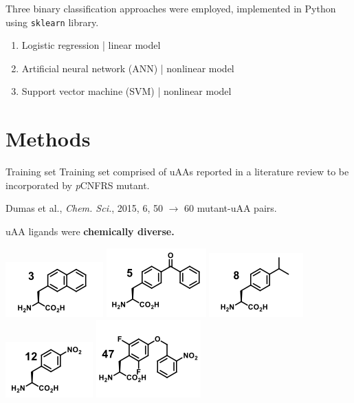 \documentclass{beamer}
\begin{document}
\begin{frame}
    Three binary classification approaches were employed, implemented in Python using \texttt{sklearn} library.
    \begin{enumerate}
        \item Logistic regression | linear model
    \item Artificial neural network (ANN) | nonlinear model
        \item Support vector machine (SVM) | nonlinear model
    \end{enumerate}

\end{frame}

\section{Methods}
\begin{frame}{Training set}
    Training set comprised of uAAs reported in a literature review to be incorporated by \textit{p}CNFRS mutant.
    
    Dumas et al., \textit{Chem. Sci.}, 2015, 6, 50 $\rightarrow$ 60 mutant-uAA pairs.
    
    uAA ligands were \textbf{chemically diverse.}
    
    \includegraphics[scale = 0.4]{uAA3.png}
    \includegraphics[scale = 0.4]{uAA5.png}
    \includegraphics[scale = 0.4]{uAA8.png}
    \includegraphics[scale = 0.4]{uAA12.png}
    \includegraphics[scale = 0.4]{uAA47.png}
\end{frame}
\end{document}
